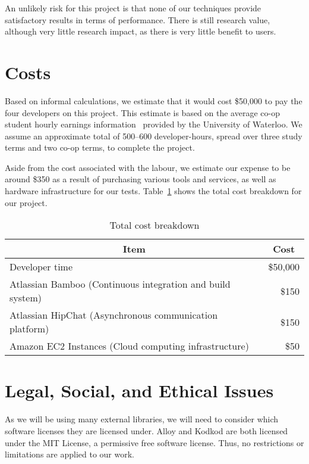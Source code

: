 \documentclass[11pt]{article}
\begin{document}
An unlikely risk for this project is that none of our techniques
provide satisfactory results in terms of performance. There is still
research value, although very little research impact, as there is very
little benefit to users.

\section{Costs}\label{sec:costs}
Based on informal calculations, we estimate that it would cost \$50,000
to pay the four developers on this project. This estimate is based on
the average co-op student hourly earnings information~\cite{ref:ceca}
provided by the University of Waterloo. We assume an approximate total
of 500--600 developer-hours, spread over three study terms and two
co-op terms, to complete the project.

Aside from the cost associated with the labour, we estimate our expense
to be around \$350 as a result of purchasing various tools and
services, as well as hardware infrastructure for our tests.
Table~\ref{tbl:costbreakdown} shows the total cost breakdown for our
project.

\begin{table}
  \captionsetup{margin=30pt}
  \caption{Total cost breakdown}\label{tbl:costbreakdown}
  \centering
  \begin{tabular}{lr}
    \hline
    \multicolumn{1}{c}{\textbf{Item}} &
    \multicolumn{1}{c}{\textbf{Cost}} \\
    \hline
      Developer time & \$50,000 \\
      Atlassian Bamboo (Continuous integration and build system) \cite{ref:bamboo} & \$150 \\
      Atlassian HipChat (Asynchronous communication platform) \cite{ref:hipchat} & \$150 \\
      Amazon EC2 Instances (Cloud computing infrastructure) \cite{ref:ec2} & \$50 \\
  \end{tabular}
\end{table}

\section{Legal, Social, and Ethical Issues}\label{sec:issues}
As we will be using many external libraries, we will need to consider
which software licenses they are licensed under. Alloy and Kodkod are
both licensed under the MIT License, a permissive free software
license. Thus, no restrictions or limitations are applied to our work.
\end{document}
